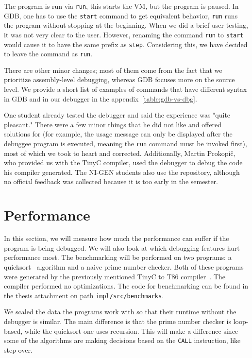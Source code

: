 The program is run via \texttt{run}, this starts the VM, but the program is
paused. In GDB, one has to use the \texttt{start} command to get equivalent
behavior, \texttt{run} runs the program without stopping at the beginning. When
we did a brief user testing, it was not very clear to the user. However,
renaming the command \texttt{run} to \texttt{start} would cause it to have the
same prefix as \texttt{step}. Considering this, we have decided to leave the
command as \texttt{run}.

There are other minor changes; most of them come from the fact that we
prioritize assembly-level debugging, whereas GDB focuses more on the source
level. We provide a short list of examples of commands that have different
syntax in GDB and in our debugger in the appendix~\ref{table:gdb-vs-dbg}.

One student already tested the debugger and said the experience was "quite
pleasant." There were a few minor things that he did not like and offered
solutions for (for example, the usage message can only be displayed after the
debuggee program is executed, meaning the \texttt{run} command must be invoked
first), most of which we took to heart and corrected. Additionally, Martin
Prokopič, who provided us with the TinyC compiler, used the debugger to debug
the code his compiler generated. The NI-GEN students also use the repository,
although no official feedback was collected because it is too early in the
semester.

\section{Performance}\label{section:benchmark}
In this section, we will measure how much the performance can suffer if the
program is being debugged. We will also look at which debugging features hurt
performance most. The benchmarking will be performed on two programs: a
quicksort~\cite{quicksort} algorithm and a naive prime number checker. Both of
these programs were generated by the previously mentioned TinyC to T86
compiler~\cite{martintinyc}. The compiler performed no optimizations. The code
for benchmarking can be found in the thesis attachment on path
\texttt{impl/src/benchmarks}.

We scaled the data the programs work with so that their runtime without the
debugger is similar. The main difference is that the prime number checker is
loop-based, while the quicksort one uses recursion. This will make a difference
since some of the algorithms are making decisions based on the \texttt{CALL}
instruction, like step over.

